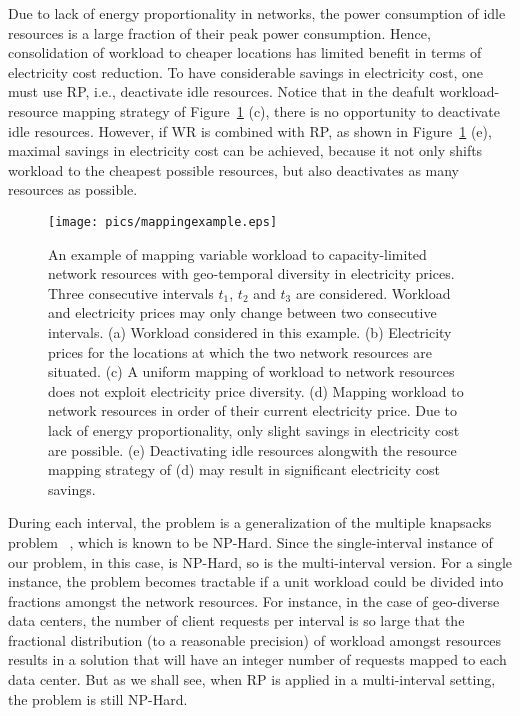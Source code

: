 Due to lack of energy proportionality in networks, the power consumption of idle resources is a large fraction of their peak power consumption. Hence, consolidation of workload to cheaper locations has limited benefit in terms of electricity cost reduction. To have considerable savings in electricity cost, one must use RP, i.e., deactivate idle resources. Notice that in the deafult workload-resource mapping strategy of Figure~\ref{fig:mappingexample} (c), there is no opportunity to deactivate idle resources. However, if WR is combined with RP, as shown in Figure~\ref{fig:mappingexample} (e), maximal savings in electricity cost can be achieved, because it not only shifts workload to the cheapest possible resources, but also deactivates as many resources as possible. 

\begin{figure}
\centering
\texttt{[image: pics/mappingexample.eps]}
\caption{An example of mapping variable workload to capacity-limited network resources with geo-temporal diversity in electricity prices. Three consecutive intervals $t_1$, $t_2$ and $t_3$ are considered. Workload and electricity prices may only change between two consecutive intervals. (a) Workload considered in this example. (b) Electricity prices for the locations at which the two network resources are situated. (c) A uniform mapping of workload to network resources does not exploit electricity price diversity. (d) Mapping workload to network resources in order of their current electricity price. Due to lack of energy proportionality, only slight savings in electricity cost are possible. (e) Deactivating idle resources alongwith the resource mapping strategy of (d) may result in significant electricity cost savings.}
\label{fig:mappingexample}
\end{figure}

During each interval, the problem is a generalization of the multiple knapsacks problem ~\cite{kellerer:knapsackproblems:2005,Chekuri99aptas}, which is known to be NP-Hard. Since the single-interval instance of our problem, in this case, is NP-Hard, so is the multi-interval version. For a single instance, the problem becomes tractable if a unit workload could be divided into fractions amongst the network resources. For instance, in the case of geo-diverse data centers, the number of client requests per interval is so large that the fractional distribution (to a reasonable precision) of workload amongst resources results in a solution that will have an integer number of requests mapped to each data center. But as we shall see, when RP is applied in a multi-interval setting, the problem is still NP-Hard.

